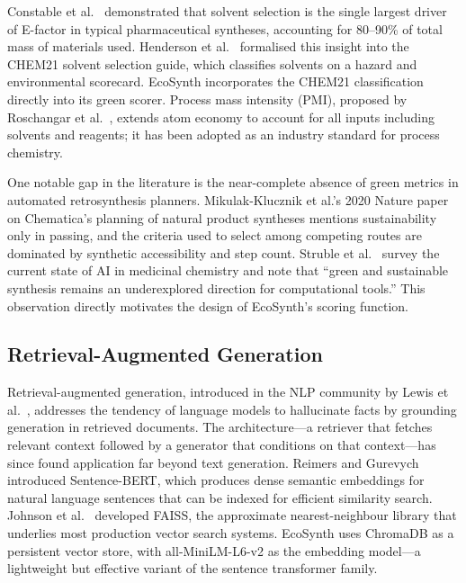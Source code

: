 \documentclass[12pt,a4paper]{article}
\begin{document}
Constable et al.~\cite{constable2007solvents} demonstrated that solvent
selection is the single largest driver of E-factor in typical pharmaceutical
syntheses, accounting for 80--90\% of total mass of materials used.
Henderson et al.~\cite{henderson2011chem21} formalised this insight into the
CHEM21 solvent selection guide, which classifies solvents on a hazard and
environmental scorecard. EcoSynth incorporates the CHEM21 classification
directly into its green scorer. Process mass intensity (PMI), proposed by
Roschangar et al.~\cite{roschangar2015pmi}, extends atom economy to account
for all inputs including solvents and reagents; it has been adopted as an
industry standard for process chemistry.

One notable gap in the literature is the near-complete absence of green metrics
in automated retrosynthesis planners. Mikulak-Klucznik et al.'s 2020 Nature
paper \cite{mikulak2020computational} on Chematica's planning of natural
product syntheses mentions sustainability only in passing, and the criteria
used to select among competing routes are dominated by synthetic accessibility
and step count. Struble et al.~\cite{struble2020current} survey the current
state of AI in medicinal chemistry and note that ``green and sustainable
synthesis remains an underexplored direction for computational tools.'' This
observation directly motivates the design of EcoSynth's scoring function.

\subsection{Retrieval-Augmented Generation}

Retrieval-augmented generation, introduced in the NLP community by Lewis et
al.~\cite{lewis2020rag}, addresses the tendency of language models to hallucinate
facts by grounding generation in retrieved documents. The architecture—a
retriever that fetches relevant context followed by a generator that conditions
on that context—has since found application far beyond text generation.
Reimers and Gurevych~\cite{reimers2019sentencebert} introduced
Sentence-BERT, which produces dense semantic embeddings for natural language
sentences that can be indexed for efficient similarity search. Johnson et
al.~\cite{johnson2019faiss} developed FAISS, the approximate nearest-neighbour
library that underlies most production vector search systems. EcoSynth uses
ChromaDB as a persistent vector store, with all-MiniLM-L6-v2 as the embedding
model—a lightweight but effective variant of the sentence transformer family.
\end{document}
